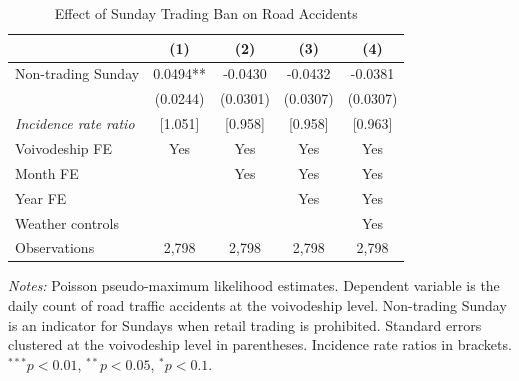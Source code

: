 \begin{table}[htbp]
\centering
\caption{Effect of Sunday Trading Ban on Road Accidents}
\label{tab:main}
\begin{tabular}{lcccc}
\hline\hline
 & (1) & (2) & (3) & (4) \\
\hline
  Non-trading Sunday & 0.0494** & -0.0430 & -0.0432 & -0.0381 \\
   & (0.0244) & (0.0301) & (0.0307) & (0.0307) \\
  \emph{Incidence rate ratio} & [1.051] & [0.958] & [0.958] & [0.963] \\
\hline
  Voivodeship FE & Yes & Yes & Yes & Yes \\
  Month FE & & Yes & Yes & Yes \\
  Year FE & & & Yes & Yes \\
  Weather controls & & & & Yes \\
  Observations & 2,798 & 2,798 & 2,798 & 2,798 \\
\hline\hline
\end{tabular}
\begin{tablenotes}[flushleft]
\small
\item \textit{Notes:} Poisson pseudo-maximum likelihood estimates. Dependent variable is the daily count of road traffic accidents at the voivodeship level. Non-trading Sunday is an indicator for Sundays when retail trading is prohibited. Standard errors clustered at the voivodeship level in parentheses. Incidence rate ratios in brackets. $^{***}p<0.01$, $^{**}p<0.05$, $^{*}p<0.1$.
\end{tablenotes}
\end{table}

